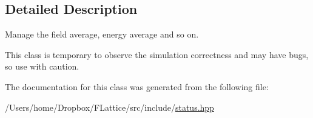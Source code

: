 \subsection{Detailed Description}
Manage the field average, energy average and so on. 

This class is temporary to observe the simulation correctness and may have bugs, so use with caution. 

The documentation for this class was generated from the following file\+:\begin{DoxyCompactItemize}
\item 
/\+Users/home/\+Dropbox/\+F\+Lattice/src/include/\mbox{\hyperlink{status_8hpp}{status.\+hpp}}\end{DoxyCompactItemize}
